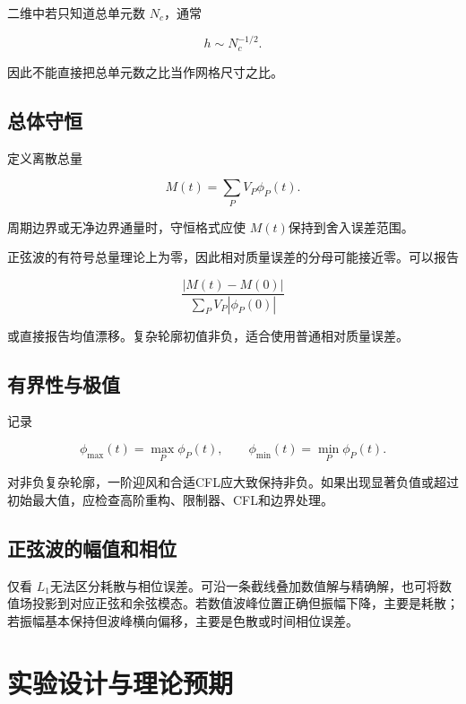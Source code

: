 \documentclass[UTF8,12pt,a4paper,fontset=fandol]{ctexart}
\numberwithin{equation}{section}
\begin{document}
二维中若只知道总单元数 $N_c$，通常

\begin{equation}
  h\sim N_c^{-1/2}.
\end{equation}

因此不能直接把总单元数之比当作网格尺寸之比。

\subsection{总体守恒}

定义离散总量

\begin{equation}
  M(t)=\sum_PV_P\phi_P(t).
\end{equation}

周期边界或无净边界通量时，守恒格式应使 $M(t)$保持到舍入误差范围。

正弦波的有符号总量理论上为零，因此相对质量误差的分母可能接近零。可以报告

\begin{equation}
  \frac{|M(t)-M(0)|}
  {\sum_PV_P|\phi_P(0)|}
\end{equation}

或直接报告均值漂移。复杂轮廓初值非负，适合使用普通相对质量误差。

\subsection{有界性与极值}

记录

\begin{equation}
  \phi_{\max}(t)=\max_P\phi_P(t),
  \qquad
  \phi_{\min}(t)=\min_P\phi_P(t).
\end{equation}

对非负复杂轮廓，一阶迎风和合适CFL应大致保持非负。如果出现显著负值或超过初始最大值，应检查高阶重构、限制器、CFL和边界处理。

\subsection{正弦波的幅值和相位}

仅看 $L_1$无法区分耗散与相位误差。可沿一条截线叠加数值解与精确解，也可将数值场投影到对应正弦和余弦模态。若数值波峰位置正确但振幅下降，主要是耗散；若振幅基本保持但波峰横向偏移，主要是色散或时间相位误差。

\section{实验设计与理论预期}
\end{document}
